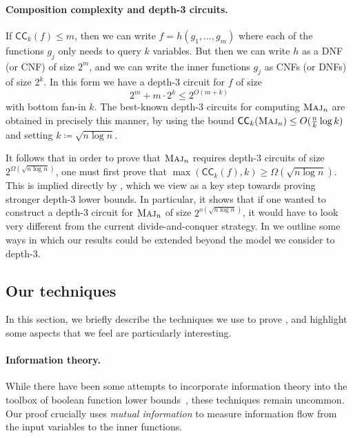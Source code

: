 \documentclass[10pt,a4paper]{article}
\theoremstyle{definition}
\theoremstyle{remark}
\newcommand{\mathsc}[1]{{\normalfont\textsc{#1}}}
\DeclareMathOperator{\Maj}{\mathsc{Maj}}
\newcommand{\Majority}{\Maj}
\newcommand{\CC}{\mathsf{CC}}
\begin{document}
\paragraph*{Composition complexity and depth-3 circuits.} If $\CC_k(f) \leq m$, then we can write $f=  h(g_1, \ldots, g_m)$ where each of the functions $g_j$ only needs to query $k$ variables.
But then  we can write $h$ as a DNF (or CNF) of size $2^m$, and we can write the inner functions $g_j$ as CNFs (or DNFs) of size $2^k$.
In this form we have a depth-3 circuit for $f$ of size
\begin{equation}
\label{eq:cc-to-depth3}
2^m + m\cdot 2^k
\leq 
2^{O(m + k)}
\end{equation}
with bottom fan-in $k$.
The best-known depth-3 circuits for computing $\Maj_n$ are obtained in precisely this manner,
by using the bound
$\CC_k(\Maj_n) \leq O(\frac{n}{k} \log k)$ and setting $k \coloneqq \sqrt{n\log n}$.

It follows that in order to prove that $\Majority_n$ requires depth-3 circuits of size $2^{\Omega(\sqrt{n \log n})}$, one must first prove that $\max(\CC_k(f), k) \geq \Omega(\sqrt{n \log n})$.
This is implied directly by , which we view as a key  step towards proving stronger depth-3 lower bounds. In particular, it shows that if one wanted to construct a depth-3 circuit for $\Majority_n$ of size $2^{o(\sqrt{n \log n})}$, it would have to look very different from the current divide-and-conquer strategy.
In  we outline some ways in which our results could be extended beyond the model we consider to depth-3.






\subsection{Our techniques}\label{sec:techniques}

In this section, we briefly describe the techniques we use to prove , and highlight some aspects that we feel are particularly interesting.



\paragraph*{Information theory.}
While there have been some attempts to incorporate information theory into the toolbox of boolean function lower bounds~\cite{NW95,GMWW14}, these techniques remain uncommon.
Our proof crucially uses
\emph{mutual information} to measure information flow from the input variables to the inner functions.
\end{document}
